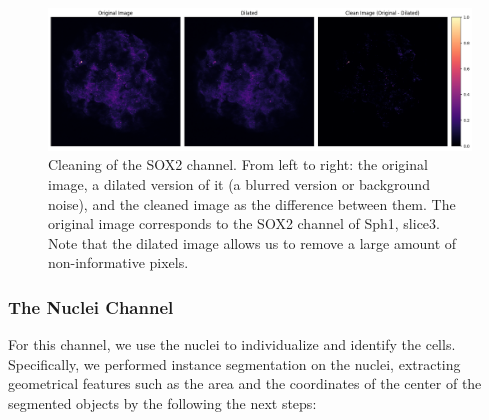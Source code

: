 \documentclass[fleqn,10pt]{wlscirep}
\begin{document}
\begin{figure}[h!]
    \centering
    \includegraphics[width=\linewidth]{images/sph1_slice3/sox2_cleaning_improved.png}
    \caption{Cleaning of the SOX2 channel. From left to right: the original image, a dilated version of it (a blurred version or background noise), and the cleaned image as the difference between them. The original image corresponds to the SOX2 channel of \textsf{Sph1, slice3}. Note that the dilated image allows us to remove a large amount of non-informative pixels.  }
    \label{fig: sox2 before and after}
\end{figure}


\subsubsection*{The Nuclei Channel}
For this channel, we use the nuclei to individualize and identify the cells. Specifically, we performed instance segmentation on the nuclei, extracting geometrical features such as the area and the coordinates of the center of the segmented objects by the following the next steps: 
\end{document}
